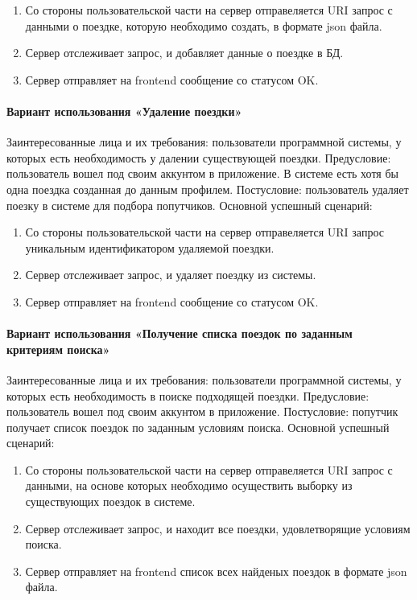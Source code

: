 \begin{enumerate}
	\item Со стороны пользовательской части на сервер отправеляется URI запрос с данными о поездке, которую необходимо создать, в формате json файла.
	\item Сервер отслеживает запрос, и добавляет данные о поездке в БД.
	\item Сервер отправляет на frontend сообщение со статусом  OK.
\end{enumerate}

\paragraph{Вариант использования «Удаление поездки»}
Заинтересованные лица и их требования: пользователи программной системы, у которых есть необходимость у далении существующей поездки. Предусловие:  пользователь вошел под своим аккунтом в приложение. В системе есть хотя бы одна поездка созданная до данным профилем. Постусловие: пользователь удаляет поезку в системе для подбора попутчиков.
Основной успешный сценарий:

\begin{enumerate}
	\item Со стороны пользовательской части на сервер отправеляется URI запрос уникальным идентификатором удаляемой поездки.
	\item Сервер отслеживает запрос, и удаляет поездку из системы.
	\item Сервер отправляет на frontend сообщение со статусом  OK.
\end{enumerate}

\paragraph{Вариант использования «Получение списка поездок по заданным критериям поиска»}
Заинтересованные лица и их требования: пользователи программной системы, у которых есть необходимость в поиске подходящей поездки. Предусловие:  пользователь вошел под своим аккунтом в приложение. Постусловие: попутчик получает список поездок по заданным условиям поиска.
Основной успешный сценарий:

\begin{enumerate}
	\item Со стороны пользовательской части на сервер отправеляется URI запрос с данными, на основе которых необходимо осуществить выборку из существующих поездок в системе.
	\item Сервер отслеживает запрос, и находит все поездки, удовлетворящие условиям поиска.
	\item Сервер отправляет на frontend список всех найденых поездок в формате json файла.
\end{enumerate}

